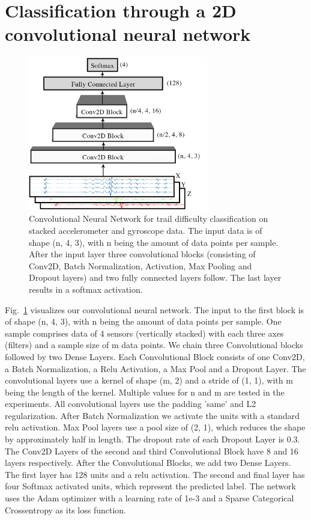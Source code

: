 \documentclass[runningheads]{llncs}
\begin{document}
\section{Classification through a 2D convolutional neural network}

\begin{figure}
\centering 
\includegraphics[width=0.70\textwidth]{network.jpg}
\caption{Convolutional Neural Network for trail difficulty classification on stacked accelerometer and gyroscope data. 
The input data is of shape (n, 4, 3), with n being the amount of data points per sample. 
After the input layer three convolutional blocks (consisting of Conv2D, Batch Normalization, Activation, Max Pooling and Dropout layers) and two fully connected layers follow.
The last layer results in a softmax activation.}
\label{fig3}	
\end{figure}

Fig.~\ref{fig3} visualizes our convolutional neural network.
The input to the first block is of shape (n, 4, 3), with n being the amount of data points per sample. One sample comprises data of 4 sensors (vertically stacked) with each three axes (filters) and a sample size of m data points.
We chain three Convolutional blocks followed by two Dense Layers.
Each Convolutional Block consists of one Conv2D, a Batch Normalization, a Relu Activation, a Max Pool and a Dropout Layer.
The convolutional layers use a kernel of shape (m, 2) and a stride of (1, 1), with m being the length of the kernel.
Multiple values for n and m are tested in the experiments.
All convolutional layers use the padding 'same' and L2 regularization.
After Batch Normalization we activate the units with a standard relu activation.
Max Pool layers use a pool size of (2, 1), which reduces the shape by approximately half in length.
The dropout rate of each Dropout Layer is 0.3.
The Conv2D Layers of the second and third Convolutional Block have 8 and 16 layers respectively.
After the Convolutional Blocks, we add two Dense Layers. 
The first layer has 128 units and a relu activation.
The second and final layer has four Softmax activated units, which represent the predicted label.
The network uses the Adam optimizer with a learning rate of 1e-3 and a Sparse Categorical Crossentropy as its loss function.
\end{document}
